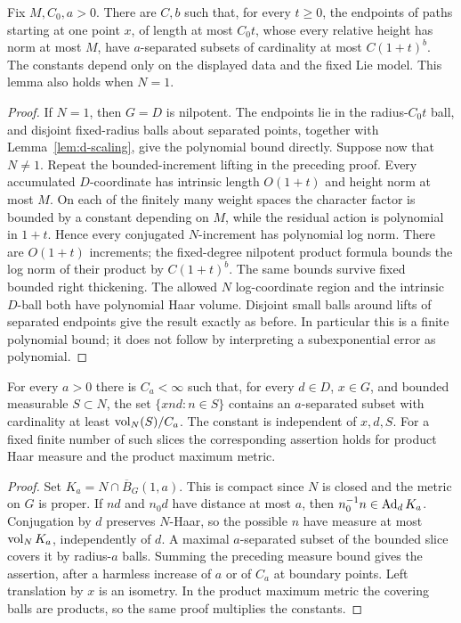 \begin{lemma}
\label{lem:polynomial-path-packing}
Fix $M,C_0,a>0$. There are $C,b$ such that, for every $t\ge0$,
the endpoints of paths starting at one point $x$, of length at
most $C_0t$, whose every relative height has norm at most $M$,
have $a$-separated subsets of cardinality at most
$C(1+t)^b$. The constants depend only on the displayed data and
the fixed Lie model. This lemma also holds when $N=1$.
\end{lemma}

\begin{proof}
If $N=1$, then $G=D$ is nilpotent. The endpoints lie in the
radius-$C_0t$ ball, and disjoint fixed-radius balls about separated
points, together with Lemma~\ref{lem:d-scaling}, give the polynomial
bound directly. Suppose now that $N\ne1$.
Repeat the bounded-increment lifting in the preceding proof.
Every accumulated $D$-coordinate has intrinsic length $O(1+t)$
and height norm at most $M$. On each of the finitely many weight
spaces the character factor is bounded by a constant depending
on $M$, while the residual action is polynomial in $1+t$.
Hence every conjugated $N$-increment has polynomial log norm.
There are $O(1+t)$ increments; the fixed-degree nilpotent product
formula bounds the log norm of their product by $C(1+t)^b$.
The same bounds survive fixed bounded right thickening.
The allowed $N$ log-coordinate region and the intrinsic $D$-ball
both have polynomial Haar volume. Disjoint small balls around
lifts of separated endpoints give the result exactly as before.
In particular this is a finite polynomial bound; it does not
follow by interpreting a subexponential error as polynomial.
\end{proof}

\begin{lemma}\label{lem:fixed-sheet-packing}
For every $a>0$ there is $C_a<\infty$ such that, for every $d\in D$,
$x\in G$, and bounded measurable $S\subset N$, the set
$\{xnd:n\in S\}$ contains an $a$-separated subset with cardinality
at least $\operatorname{vol}_N(S)/C_a$. The constant is independent of $x,d,S$.
For a fixed finite number of such slices the corresponding assertion
holds for product Haar measure and the product maximum metric.
\end{lemma}

\begin{proof}
Set $K_a=N\cap\overline B_G(1,a)$. This is compact since $N$ is
closed and the metric on $G$ is proper. If $nd$ and $n_0d$ have
distance at most $a$, then
$n_0^{-1}n\in\operatorname{Ad}_dK_a$.
Conjugation by $d$ preserves $N$-Haar, so the possible $n$ have
measure at most $\operatorname{vol}_N K_a$, independently of $d$. A maximal
$a$-separated subset of the bounded slice covers it by radius-$a$
balls. Summing the preceding measure bound gives the assertion,
after a harmless increase of $a$ or of $C_a$ at boundary points.
Left translation by $x$ is an isometry. In the product maximum
metric the covering balls are products, so the same proof
multiplies the constants.
\end{proof}

